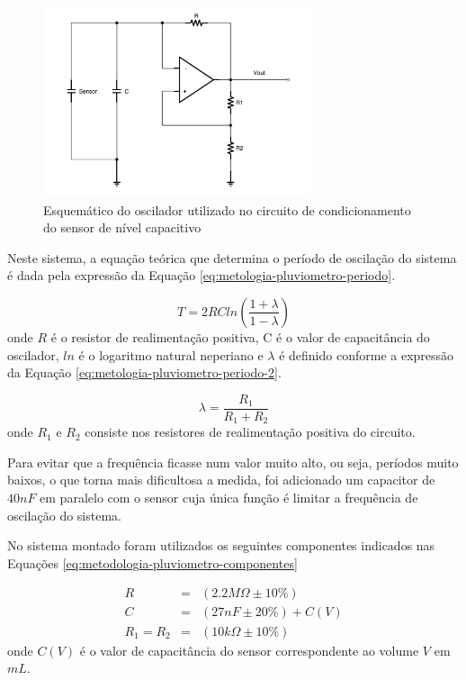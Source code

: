 \documentclass[a4paper]{instrumentacao}
\begin{document}
\begin{figure}[H]
	\centering
	\includegraphics[width=0.7\textwidth]{Circuitos/Pluviometro-Oscilador.pdf}
	\caption{Esquemático do oscilador utilizado no circuito de condicionamento do sensor de nível capacitivo}
	\label{fig:metodologia-capacitivo-oscilador}
\end{figure}

Neste sistema, a equação teórica que determina o período de oscilação do sistema é dada pela expressão da Equação \ref{eq:metologia-pluviometro-periodo}.

\begin{equation}
	T = 2 R C ln \left(\frac{1+\lambda}{1-\lambda}\right)
	\label{eq:metologia-pluviometro-periodo}
\end{equation}
\noindent onde $R$ é o resistor de realimentação positiva, C é o valor de capacitância do oscilador, $ln$ é o logaritmo natural neperiano e $\lambda$ é definido conforme a expressão da Equação \ref{eq:metologia-pluviometro-periodo-2}.

\begin{equation}
	\lambda = \frac{R_1}{R_1 + R_2}
	\label{eq:metologia-pluviometro-periodo-2}
\end{equation}
\noindent onde $R_1$ e $R_2$ consiste nos resistores de realimentação positiva do circuito.

Para evitar que a frequência ficasse num valor muito alto, ou seja, períodos muito baixos, o que torna mais dificultosa a medida, foi adicionado um capacitor de $40 nF$ em paralelo com o sensor cuja única função é limitar a frequência de oscilação do sistema.

No sistema montado foram utilizados os seguintes componentes indicados nas Equações \ref{eq:metodologia-pluviometro-componentes}

\begin{eqnarray}
	R &=& (2.2 M\Omega \pm 10\%) 		\label{eq:metodologia-pluviometro-componentes}					\\
	C &=& (27 nF \pm 20\%) + C(V) 		\nonumber			\\
	R_1 = R_2 &=& (10 k\Omega \pm 10\%)	\nonumber
\end{eqnarray}
\noindent onde $C(V)$ é o valor de capacitância do sensor correspondente ao volume $V$ em $mL$.
\end{document}

